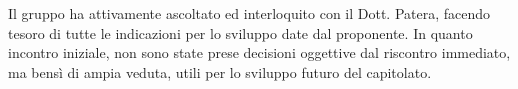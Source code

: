 Il gruppo \Gruppo{} ha attivamente ascoltato ed interloquito con il Dott. Patera, facendo tesoro di tutte le indicazioni per lo sviluppo date dal proponente.
In quanto incontro iniziale, non sono state prese decisioni oggettive dal riscontro immediato, ma bensì di ampia veduta, utili per lo sviluppo futuro del capitolato.